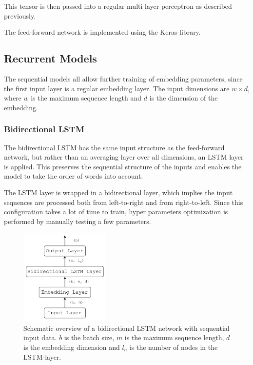 This tensor is then passed into a regular multi layer perceptron as described previously.

The feed-forward network is implemented using the Keras-library. 

\subsection{Recurrent Models}

The sequential models all allow further training of embedding parameters, since the first input layer is a regular embedding layer. The input dimensions are $w \times d$, where $w$ is the maximum sequence length and $d$ is the dimension of the embedding. 

\subsubsection{Bidirectional LSTM}

The bidirectional LSTM has the same input structure as the feed-forward network, but rather than an averaging layer over all dimensions, an LSTM layer is applied. This preserves the sequential structure of the inputs and enables the model to take the order of words into account. 

The LSTM layer is wrapped in a bidirectional layer, which implies the input sequences are processed both from left-to-right and from right-to-left. Since this configuration takes a lot of time to train, hyper parameters optimization is performed by manually testing a few parameters.  

\begin{figure}[h]
    \centering
    \includegraphics[width=0.4\textwidth]{Figures/figs-bidir-lstm.pdf}
    \caption{Schematic overview of a bidirectional LSTM network with sequential input data. $b$ is the batch size, $m$ is the maximum sequence length, $d$ is the embedding dimension and $l_n$ is the number of nodes in the LSTM-layer.}
\end{figure}


